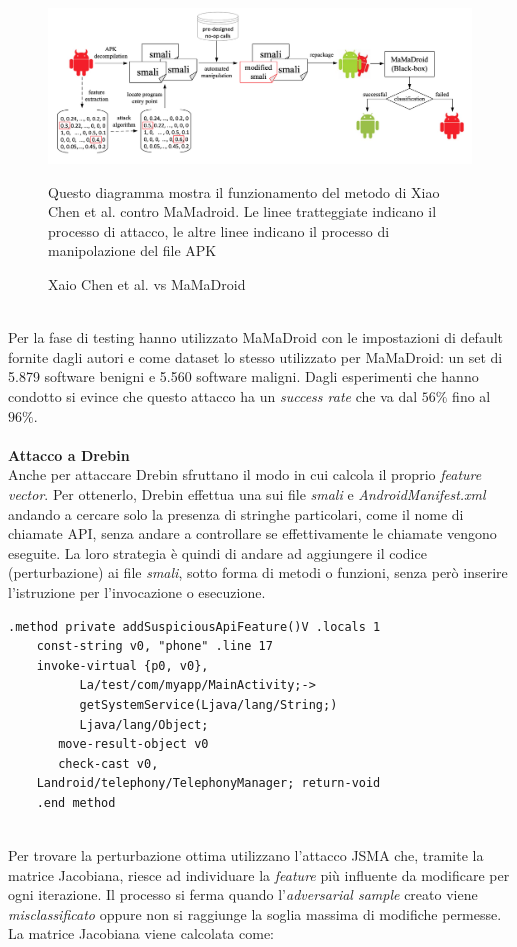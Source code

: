 \begin{figure}[h!]
  \includegraphics[scale=0.4]{aml_vs_md/imgs/chen_mamadroid.png}
  \caption{Xaio Chen et al. vs MaMaDroid}
  Questo diagramma mostra il funzionamento del metodo di Xiao Chen et al. contro MaMadroid. Le linee tratteggiate indicano il processo di attacco, le altre linee indicano il processo di manipolazione del file APK
\end{figure}

\ \\
Per la fase di testing hanno utilizzato MaMaDroid con le impostazioni di default fornite dagli autori e come dataset lo stesso utilizzato per MaMaDroid: un set di 5.879 software benigni e 5.560 software maligni.
Dagli esperimenti che hanno condotto si evince che questo attacco ha un \textit{success rate} che va dal \(56\%\)\cite{hiv} fino al \(96\%\)\cite{hiv}.\\
\ \\
\textbf{Attacco a Drebin}\\
Anche per attaccare Drebin sfruttano il modo in cui calcola il proprio \textit{feature vector}. Per ottenerlo, Drebin effettua una  sui file \textit{smali} e \textit{AndroidManifest.xml} andando a cercare solo la presenza di stringhe particolari, come il nome di chiamate API, senza andare a controllare se effettivamente le chiamate vengono eseguite. La loro strategia è quindi di andare ad aggiungere il codice (perturbazione) ai file \textit{smali}, sotto forma di metodi o funzioni, senza però inserire l'istruzione per l'invocazione o esecuzione.

\begin{lstlisting}[caption=Esempio di perturbazione che verrà aggiunta nei file smali.]
    .method private addSuspiciousApiFeature()V .locals 1
    const-string v0, "phone" .line 17
    invoke-virtual {p0, v0},
          La/test/com/myapp/MainActivity;->
          getSystemService(Ljava/lang/String;)
          Ljava/lang/Object;
       move-result-object v0
       check-cast v0,
    Landroid/telephony/TelephonyManager; return-void
    .end method
\end{lstlisting}
\ \\
Per trovare la perturbazione ottima utilizzano l'attacco JSMA che, tramite la matrice Jacobiana, riesce ad individuare la \textit{feature} più influente da modificare per ogni iterazione. Il processo si ferma quando l'\textit{adversarial sample} creato viene \textit{misclassificato} oppure non si raggiunge la soglia massima di modifiche permesse. La matrice Jacobiana viene calcolata come: 

